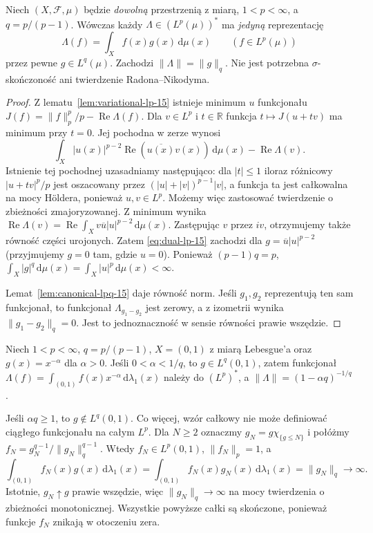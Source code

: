 \begin{twierdzenie}
\label{thm:dual-lp-15}
Niech $(X,\mathcal F,\mu)$ będzie \emph{dowolną} przestrzenią
z miarą, $1<p<\infty$, a $q=p/(p-1)$.
Wówczas każdy $\Lambda\in (L^p(\mu))^*$ ma \emph{jedyną}
reprezentację
\begin{equation}\label{eq:dual-lp-15}
\Lambda(f)=\int_X f(x)g(x)\,\mathrm d\mu(x)
\qquad(f\in L^p(\mu))
\end{equation}
przez pewne $g\in L^q(\mu)$. Zachodzi
$\|\Lambda\|=\|g\|_q$. Nie jest potrzebna
$\sigma$-skończoność ani twierdzenie Radona--Nikodyma.
\end{twierdzenie}
\begin{proof}
Z lematu~\ref{lem:variational-lp-15} istnieje minimum $u$
funkcjonału $J(f)=\|f\|_p^p/p-\operatorname{Re}\Lambda(f)$.
Dla $v\in L^p$ i $t\in\mathbb R$ funkcja $t\mapsto J(u+tv)$
ma minimum przy $t=0$. Jej pochodna w zerze wynosi
\[
\int_X |u(x)|^{p-2}\operatorname{Re}(\overline{u(x)}v(x))
\,\mathrm d\mu(x)-\operatorname{Re}\Lambda(v).
\]
Istnienie tej pochodnej uzasadniamy następująco:
dla $|t|\le1$ iloraz różnicowy $|u+tv|^p/p$ jest
oszacowany przez $(|u|+|v|)^{p-1}|v|$,
a funkcja ta jest całkowalna na mocy Höldera,
ponieważ $u,v\in L^p$. Możemy więc zastosować
twierdzenie o zbieżności zmajoryzowanej. Z minimum
wynika $\operatorname{Re}\Lambda(v)=
\operatorname{Re}\int_Xv\overline u|u|^{p-2}\,\mathrm d\mu(x)$.
Zastępując $v$ przez $iv$, otrzymujemy także
równość części urojonych. Zatem \eqref{eq:dual-lp-15}
zachodzi dla $g=\overline u|u|^{p-2}$ (przyjmujemy $g=0$
tam, gdzie $u=0$). Ponieważ $(p-1)q=p$,
$\int_X|g|^q\,\mathrm d\mu(x)=\int_X|u|^p\,\mathrm d\mu(x)<\infty$.

Lemat~\ref{lem:canonical-lpq-15} daje równość norm.
Jeśli $g_1,g_2$ reprezentują ten sam funkcjonał,
to funkcjonał $\Lambda_{g_1-g_2}$ jest zerowy,
a z izometrii wynika $\|g_1-g_2\|_q=0$.
Jest to jednoznaczność w sensie równości prawie wszędzie.
\end{proof}

\begin{przyklad}
Niech $1<p<\infty$, $q=p/(p-1)$, $X=(0,1)$ z miarą
Lebesgue'a oraz $g(x)=x^{-\alpha}$ dla $\alpha>0$.
Jeśli $0<\alpha<1/q$, to $g\in L^q(0,1)$, zatem
funkcjonał $\Lambda(f)=\int_{(0,1)}f(x)x^{-\alpha}
\,\mathrm d\lambda_1(x)$ należy do $(L^p)^*$, a
$\|\Lambda\|=(1-\alpha q)^{-1/q}$.

Jeśli $\alpha q\ge1$, to $g\notin L^q(0,1)$.
Co więcej, wzór całkowy nie może definiować ciągłego
funkcjonału na całym $L^p$. Dla $N\ge2$ oznaczmy
$g_N=g\chi_{\{g\le N\}}$ i połóżmy
$f_N=g_N^{q-1}/\|g_N\|_q^{q-1}$.
Wtedy $f_N\in L^p(0,1)$, $\|f_N\|_p=1$, a
\[
\int_{(0,1)}f_N(x)g(x)\,\mathrm d\lambda_1(x)
=\int_{(0,1)}f_N(x)g_N(x)\,\mathrm d\lambda_1(x)
=\|g_N\|_q\longrightarrow\infty.
\]
Istotnie, $g_N\uparrow g$ prawie wszędzie, więc
$\|g_N\|_q\to\infty$ na mocy twierdzenia
o zbieżności monotonicznej. Wszystkie powyższe całki
są skończone, ponieważ funkcje $f_N$ znikają
w otoczeniu zera.
\end{przyklad}

